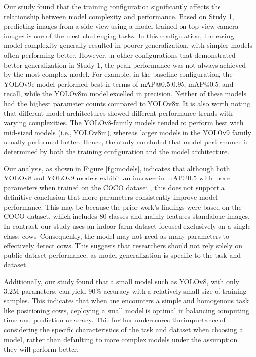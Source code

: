 Our study found that the training configuration significantly affects the relationship between model complexity and performance. Based on Study 1, predicting images from a side view using a model trained on top-view camera images is one of the most challenging tasks. In this configuration, increasing model complexity generally resulted in poorer generalization, with simpler models often performing better. However, in other configurations that demonstrated better generalization in Study 1, the peak performance was not always achieved by the most complex model. For example, in the baseline configuration, the YOLOv9e model performed best in terms of $\text{mAP@{0.5:0.95}}$, $\text{mAP@{0.5}}$, and recall, while the YOLOv8m model excelled in precision. Neither of these models had the highest parameter counts compared to YOLOv8x. It is also worth noting that different model architectures showed different performance trends with varying complexities. The YOLOv8-family models tended to perform best with mid-sized models (i.e., YOLOv8m), whereas larger models in the YOLOv9 family usually performed better. Hence, the study concluded that model performance is determined by both the training configuration and the model architecture.


Our analysis, as shown in Figure \ref{fig:models}, indicates that although both YOLOv8 \cite{ultralyticsYOLOv8} and YOLOv9 \cite{wang2024yolov9} models exhibit an increase in $\text{mAP@{0.5}}$ with more parameters when trained on the COCO dataset \cite{lin2014microsoft}, this does not support a definitive conclusion that more parameters consistently improve model performance. This may be because the prior work's findings were based on the COCO dataset, which includes 80 classes and mainly features standalone images. In contrast, our study uses an indoor farm dataset focused exclusively on a single class: cows. Consequently, the model may not need as many parameters to effectively detect cows. This suggests that researchers should not rely solely on public dataset performance, as model generalization is specific to the task and dataset.

Additionally, our study found that a small model such as YOLOv8, with only 3.2M parameters, can yield 90\% accuracy with a relatively small size of training samples. This indicates that when one encounters a simple and homogenous task like positioning cows, deploying a small model is optimal in balancing computing time and prediction accuracy. This further underscores the importance of considering the specific characteristics of the task and dataset when choosing a model, rather than defaulting to more complex models under the assumption they will perform better.


